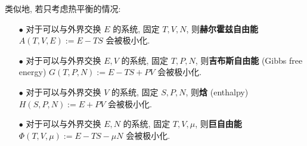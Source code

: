 类似地, 若只考虑热平衡的情况: 
\begin{enumerate}
    \item[$ \bullet $] 对于可以与外界交换 $ E $ 的系统, 固定 $ T,V,N $, 则{\bf 赫尔霍兹自由能} $ A(T,V,E):=E-TS $ 会被极小化.
    \item[$ \bullet $] 对于可以与外界交换 $ E,V $ 的系统, 固定 $ T,P,N $, 则{\bf 吉布斯自由能} (Gibbs free energy) $ G(T,P,N):=E-TS+PV $ 会被极小化.
    \item[$ \bullet $] 对于可以与外界交换 $ V $ 的系统, 固定 $ S,P,N $, 则{\bf 焓} (enthalpy) $ H(S,P,N):=E+PV $ 会被极小化.
    \item[$ \bullet $] 对于可以与外界交换 $ E,N $ 的系统, 固定 $ T,V,\mu $, 则{\bf 巨自由能} $ \Phi(T,V,\mu):=E-TS-\mu N $ 会被极小化. 
\end{enumerate} 